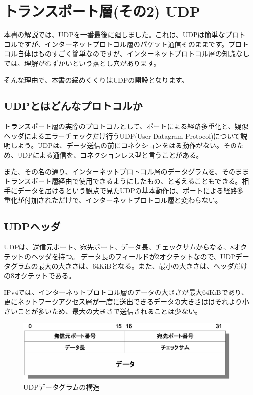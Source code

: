 \chapter{トランスポート層(その2) UDP}

本書の解説では、UDPを一番最後に廻しました。これは、UDPは簡単なプロトコルですが、インターネットプロトコル層のパケット通信そのままです。プロトコル自体はものすごく簡単なのですが、インターネットプロトコル層の知識なしでは、理解がむずかいという落とし穴があります。

そんな理由で、本書の締めくくりはUDPの開設となります。

\section{UDPとはどんなプロトコルか}

トランスポート層の実際のプロトコルとして、ポートによる経路多重化と、疑似ヘッダによるエラーチェックだけ行うUDP(User Datagram Protocol)について説明しよう。UDPは、データ送信の前にコネクションをはる動作がない。そのため、UDPによる通信を、コネクションレス型と言うことがある。

また、その名の通り、インターネットプロトコル層のデータグラムを、そのままトランスポート層経由で使用できるようにしたもの、と考えることもできる。相手にデータを届けるという観点で見たUDPの基本動作は、ポートによる経路多重化が付加されただけで、インターネットプロトコル層と変わらない。

\section{UDPヘッダ}

UDPは、送信元ポート、宛先ポート、データ長、チェックサムからなる、8オクテットのヘッダを持つ。
データ長のフィールドが2オクテットなので、UDPデータグラムの最大の大きさは、64KiBとなる。また、最小の大きさは、ヘッダだけの8オクテットである。

IPv4では、インターネットプロトコル層のデータの大きさが最大64KiBであり、更にネットワークアクセス層が一度に送出できるデータの大きさははそれより小さいことが多いため、最大の大きさで送信されることは少ない。

\begin{figure}[htbp]
	\includegraphics[width=12cm,clip]{draw/udpdatagram.eps}
	\caption{UDPデータグラムの構造}
	\label{fig:udpdatagram}
\end{figure}

